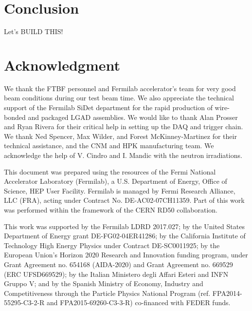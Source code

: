 \documentclass[preprint,1p]{elsarticle}
\begin{document}
\section{Conclusion}\label{sec:conclusion}

Let's BUILD THIS!


\section*{Acknowledgment}

We thank the FTBF personnel and Fermilab accelerator's team for very good beam
conditions during our test beam time. We also appreciate the technical support
of the Fermilab SiDet department for the rapid production of wire-bonded and
packaged LGAD assemblies. We would like to thank Alan Prosser and Ryan Rivera
for their critical help in setting up the DAQ and trigger chain. We thank Ned
Spencer, Max Wilder, and Forest McKinney-Martinez for their technical
assistance, and the CNM and HPK manufacturing team. We acknowledge the help of
V. Cindro and I. Mandic with the neutron irradiations.

This document was prepared using the resources of the Fermi National Accelerator
Laboratory (Fermilab), a U.S. Department of Energy, Office of Science, HEP User
Facility. Fermilab is managed by Fermi Research Alliance, LLC (FRA), acting
under Contract No. DE-AC02-07CH11359. Part of this work was performed within the
framework of the CERN RD50 collaboration.

This work was supported by the Fermilab LDRD 2017.027; by the United States
Department of Energy grant DE-FG02-04ER41286; by the California Institute of
Technology High Energy Physics under Contract DE-SC0011925; by the European
Union's Horizon 2020 Research and Innovation funding program, under Grant
Agreement no. 654168 (AIDA-2020) and Grant Agreement no. 669529 (ERC
UFSD669529); by the Italian Ministero degli Affari Esteri and INFN Gruppo V; and
by the Spanish Ministry of Economy, Industry and Competitiveness through the
Particle Physics National Program (ref. FPA2014-55295-C3-2-R and
FPA2015-69260-C3-3-R) co-financed with FEDER funds.



\end{document}
